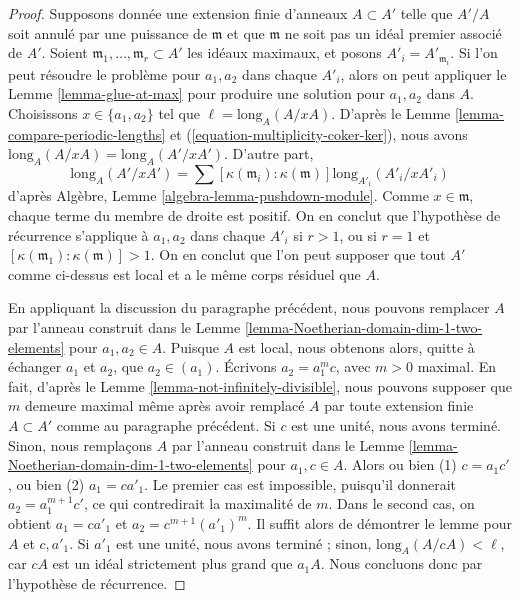 \begin{proof}
\medskip\noindent
Supposons donnée une extension finie d'anneaux $A \subset A'$ telle que
$A'/A$ soit annulé par une puissance de $\mathfrak m$ et que
$\mathfrak m$ ne soit pas un idéal premier associé de $A'$.
Soient $\mathfrak m_1, \ldots, \mathfrak m_r \subset A'$
les idéaux maximaux, et posons $A'_i = A'_{\mathfrak m_i}$.
Si l'on peut résoudre le problème pour $a_1, a_2$ dans chaque $A'_i$,
alors on peut appliquer le Lemme \ref{lemma-glue-at-max}
pour produire une solution pour $a_1, a_2$ dans $A$.
Choisissons $x \in \{a_1, a_2\}$ tel que $\ell = \text{long}_A(A/xA)$.
D'après le Lemme \ref{lemma-compare-periodic-lengths} 
et (\ref{equation-multiplicity-coker-ker}),
nous avons $\text{long}_A(A/xA) = \text{long}_A(A'/xA')$.
D'autre part,
$$
\text{long}_A(A'/xA') =
\sum [\kappa(\mathfrak m_i) : \kappa(\mathfrak m)]
\text{long}_{A'_i}(A'_i/xA'_i)
$$
d'après Algèbre, Lemme \ref{algebra-lemma-pushdown-module}.
Comme $x \in \mathfrak m$, chaque terme du membre de droite
est positif. On en conclut que l'hypothèse de récurrence s'applique
à $a_1, a_2$ dans chaque $A'_i$ si $r > 1$, ou si $r = 1$ et
$[\kappa(\mathfrak m_1) : \kappa(\mathfrak m)] > 1$.
On en conclut que l'on peut supposer que tout $A'$ comme ci-dessus est local et a
le même corps résiduel que $A$.

\medskip\noindent
En appliquant la discussion du paragraphe précédent,
nous pouvons remplacer $A$ par l'anneau construit dans le
Lemme \ref{lemma-Noetherian-domain-dim-1-two-elements}
pour $a_1, a_2 \in A$. Puisque $A$ est local, nous obtenons alors,
quitte à échanger $a_1$ et $a_2$, que $a_2 \in (a_1)$.
Écrivons $a_2 = a_1^m c$, avec $m > 0$ maximal. En fait, d'après le
Lemme \ref{lemma-not-infinitely-divisible},
nous pouvons supposer que $m$ demeure maximal même après avoir remplacé $A$
par toute extension finie $A \subset A'$ comme au paragraphe précédent.
Si $c$ est une unité, nous avons terminé. Sinon, nous remplaçons
$A$ par l'anneau construit dans le
Lemme \ref{lemma-Noetherian-domain-dim-1-two-elements}
pour $a_1, c \in A$. Alors ou bien (1) $c = a_1 c'$, ou bien
(2) $a_1 = c a'_1$. Le premier cas est impossible, puisqu'il
donnerait $a_2 = a_1^{m + 1} c'$, ce qui contredirait la
maximalité de $m$. Dans le second cas, on obtient
$a_1 = c a'_1$ et $a_2 = c^{m + 1} (a'_1)^m$.
Il suffit alors de démontrer le lemme pour $A$ et $c, a'_1$.
Si $a'_1$ est une unité, nous avons terminé ; sinon,
$\text{long}_A(A/cA) < \ell$, car $cA$ est un idéal strictement
plus grand que $a_1A$. Nous concluons donc par l'hypothèse de récurrence.
\end{proof}






